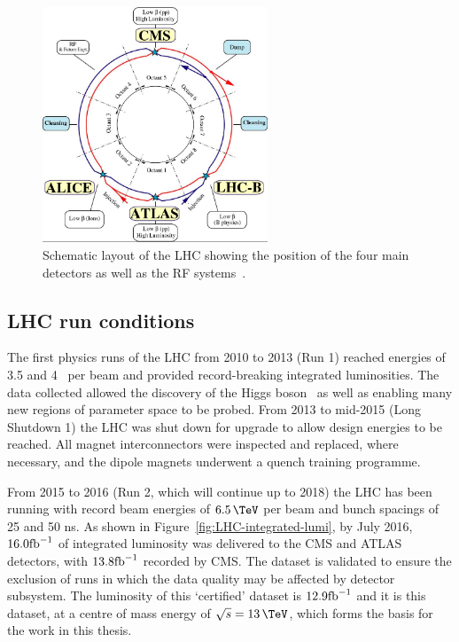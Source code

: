 \begin{figure}
\centering
    \includegraphics[width=0.6\textwidth]{./Figures/detector/lhcDiagram}
  \caption{Schematic layout of the LHC showing the position of the four main detectors as
  well as the RF systems~\cite{cms_iop}.}
  \label{fig:LHC-diagram}
\end{figure}

\subsection{LHC run conditions}

The first physics runs of the LHC from 2010 to 2013 (Run 1) reached energies of 3.5 and 4 \TeV~per beam and 
provided record-breaking integrated luminosities. The data collected allowed the 
discovery of the Higgs boson~\cite{cmsHiggs,atlasHiggs} as well as enabling many new regions of parameter space
to be probed. From 2013 to mid-2015 (Long Shutdown 1) the LHC was shut down for upgrade to allow design
energies to be reached. All magnet interconnectors were inspected and replaced, where necessary,
and the dipole magnets underwent a quench training programme. 

From 2015 to 2016 (Run 2, which will continue up to 2018) the LHC has been running with record beam energies 
of $6.5\,\TeV$ per beam and bunch spacings of 25 and 50 ns. 
As shown in Figure~\ref{fig:LHC-integrated-lumi}, by July 2016, $16.0 \text{fb}^{-1}$ of integrated luminosity was
delivered to the CMS and ATLAS detectors, with $13.8 \text{fb}^{-1}$ recorded by CMS. The dataset is validated 
to ensure the exclusion of runs in which the data quality may be affected by detector subsystem. 
The luminosity of this `certified' dataset is $12.9 \text{fb}^{-1}$ and it is this dataset, 
at a centre of mass energy of $\sqrt{s} = 13\,\TeV$, which forms the basis for the work in this thesis.

